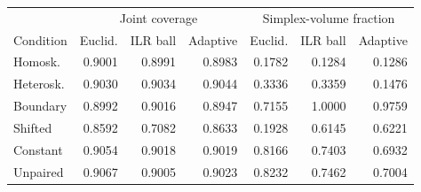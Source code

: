 \begin{tabular}{lrrrrrr}
\toprule
& \multicolumn{3}{c}{Joint coverage} & \multicolumn{3}{c}{Simplex-volume fraction} \\
Condition & Euclid. & ILR ball & Adaptive & Euclid. & ILR ball & Adaptive \\
\midrule
Homosk. & 0.9001 & 0.8991 & 0.8983 & 0.1782 & 0.1284 & 0.1286 \\
Heterosk. & 0.9030 & 0.9034 & 0.9044 & 0.3336 & 0.3359 & 0.1476 \\
Boundary & 0.8992 & 0.9016 & 0.8947 & 0.7155 & 1.0000 & 0.9759 \\
Shifted & 0.8592 & 0.7082 & 0.8633 & 0.1928 & 0.6145 & 0.6221 \\
Constant & 0.9054 & 0.9018 & 0.9019 & 0.8166 & 0.7403 & 0.6932 \\
Unpaired & 0.9067 & 0.9005 & 0.9023 & 0.8232 & 0.7462 & 0.7004 \\
\bottomrule
\end{tabular}
